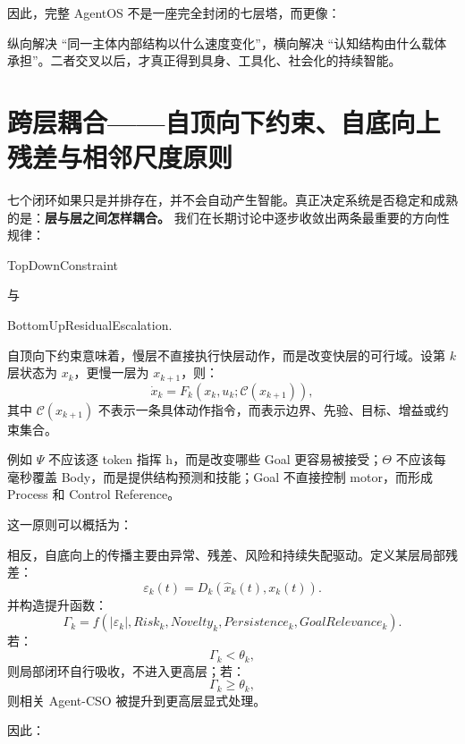 因此，完整 AgentOS 不是一座完全封闭的七层塔，而更像：
\begin{statementbox}
\centering
{}
\end{statementbox}
纵向解决 ``同一主体内部结构以什么速度变化''，横向解决 ``认知结构由什么载体承担''。二者交叉以后，才真正得到具身、工具化、社会化的持续智能。

\section{跨层耦合——自顶向下约束、自底向上残差与相邻尺度原则}

七个闭环如果只是并排存在，并不会自动产生智能。真正决定系统是否稳定和成熟的是：\textbf{层与层之间怎样耦合。} 我们在长期讨论中逐步收敛出两条最重要的方向性规律：
\begin{statementbox}
TopDownConstraint
\end{statementbox}
与
\begin{statementbox}
BottomUpResidualEscalation.
\end{statementbox}

自顶向下约束意味着，慢层不直接执行快层动作，而是改变快层的可行域。设第 $k$ 层状态为 $x_k$，更慢一层为 $x_{k+1}$，则：
\[
\dot{x}_k
=
F_k
\left(
x_k,
u_k;
\mathcal C(x_{k+1})
\right),
\]
其中 $\mathcal C(x_{k+1})$ 不表示一条具体动作指令，而表示边界、先验、目标、增益或约束集合。

例如 $\Psi$ 不应该逐 token 指挥 h，而是改变哪些 Goal 更容易被接受；$\Theta$ 不应该每毫秒覆盖 Body，而是提供结构预测和技能；Goal 不直接控制 motor，而形成 Process 和 Control Reference。

这一原则可以概括为：
\begin{statementbox}
\centering
{}
\end{statementbox}

相反，自底向上的传播主要由异常、残差、风险和持续失配驱动。定义某层局部残差：
\[
\varepsilon_k(t)
=
D_k
\left(
\hat{x}_k(t),
x_k(t)
\right).
\]
并构造提升函数：
\[
\Gamma_k
=
f
\left(
|\varepsilon_k|,
Risk_k,
Novelty_k,
Persistence_k,
GoalRelevance_k
\right).
\]
若：
\[
\Gamma_k<\theta_k,
\]
则局部闭环自行吸收，不进入更高层；若：
\[
\Gamma_k\geq\theta_k,
\]
则相关 Agent-CSO 被提升到更高层显式处理。

因此：
\begin{statementbox}
\centering
{}
\end{statementbox}

